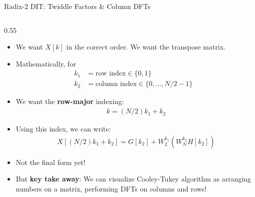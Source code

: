 \begin{frame}{Radix-2 DIT: Twiddle Factors \& Column DFTs}
    \begin{columns}
        \begin{column}{0.55\textwidth}
            \begin{itemize}
                \item We want $X[k]$ in the correct order. We want the transpose matrix.
                \item Mathematically, for
                      \begin{align*}
                          k_1 & = \text{row index} \in \{0, 1\}                 \\
                          k_2 & = \text{column index} \in \{0, \dots, N/2-1\} &
                      \end{align*}
                \item We want the \textbf{row-major} indexing:
                      \begin{align*}
                          k = (N/2) k_1 + k_2
                      \end{align*}
                \item Using this index, we can write:
                      \begin{align*}
                          X[(N/2)k_1 + k_2] = G[k_2] + W^{k_1}_2 \left(W_N^{k_2} H[k_2]\right)
                      \end{align*}
                \item Not the final form yet!
                \item But \textbf{key take away}:
                      We can visualize Cooley-Tukey algorithm as arranging numbers on a matrix, performing DFTs on columns and rows!


\end{itemize}
\end{column}
\end{columns}
\end{frame}
